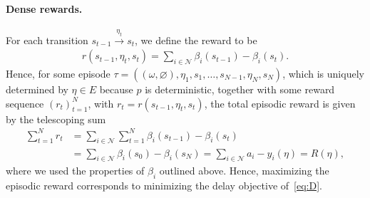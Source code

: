 \documentclass[a4paper]{report}
\theoremstyle{definition}
\theoremstyle{plain}
\begin{document}
\paragraph{Dense rewards.}
For each transition $s_{t-1} \xrightarrow{\eta_{t}} s_{t}$, we define the reward to
be
\begin{align}
  r(s_{t-1}, \eta_t, s_t) = \sum_{i \in \mathcal{N}} \beta_{i}(s_{t-1}) - \beta_{i}(s_t) .
\end{align}
Hence, for some episode
$\tau = ((\omega, \varnothing), \eta_1, s_1, \dots, s_{N-1}, \eta_N, s_N)$, which is
uniquely determined by $\eta \in E$ because $p$ is deterministic, together
with some reward sequence ${(r_t)}_{t=1}^N$, with
$r_t = r(s_{t-1}, \eta_t, s_t)$, the total episodic reward is given by the
telescoping sum
\begin{align*}
  \sum_{t=1}^{N} r_{t} &= \sum_{i \in \mathcal{N}} \sum_{t=1}^N \beta_i(s_{t-1}) - \beta_i(s_t) \\
  &= \sum_{i \in \mathcal{N}} \beta_i(s_0) - \beta_i(s_N) = \sum_{i \in \mathcal{N}} a_i - y_i(\eta) = R(\eta) ,
\end{align*}
where we used the properties of $\beta_i$ outlined above. Hence, maximizing the
episodic reward corresponds to minimizing the delay objective of~\eqref{eq:D}.
\end{document}
